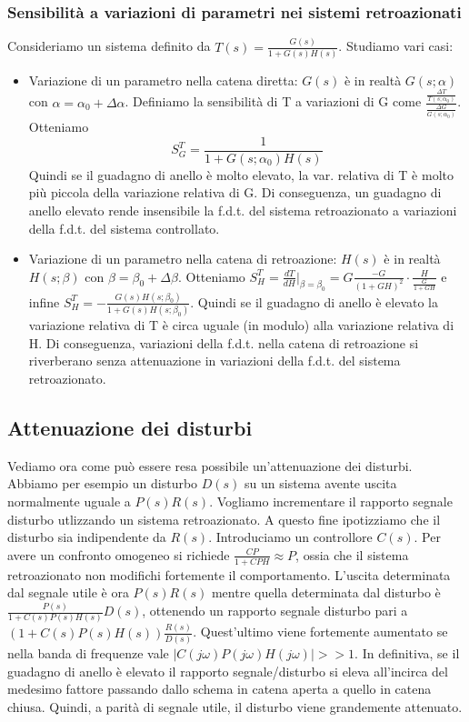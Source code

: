 \documentclass[11pt]{article}
\begin{document}
\subsubsection{Sensibilità a variazioni di parametri nei sistemi retroazionati}
Consideriamo un sistema definito da $T(s)=\frac{G(s)}{1+G(s)H(s)}$. Studiamo vari casi:
\begin{itemize}
    \item Variazione di un parametro nella catena diretta: $G(s)$ è in realtà $G(s;\alpha)$ con $\alpha=\alpha_0+\Delta\alpha$. Definiamo la sensibilità di T a variazioni di G come $\frac{\frac{\Delta T}{T(s;\alpha_0)}}{\frac{\Delta G}{G(s;\alpha_0)}}$. Otteniamo \begin{displaymath}
              S_G^T=\frac{1}{1+G(s;\alpha_0)H(s)}
          \end{displaymath} Quindi se il guadagno di anello è molto elevato, la var. relativa di T è molto più piccola della variazione relativa di G. Di conseguenza, un guadagno di anello elevato rende insensibile la f.d.t. del sistema retroazionato a variazioni della f.d.t. del sistema controllato.
    \item Variazione di un parametro nella catena di retroazione: $H(s)$ è in realtà $H(s;\beta)$ con $\beta = \beta_0+\Delta\beta$. Otteniamo $S_H^T = \frac{dT}{dH}|_{\beta=\beta_0}=G\frac{-G}{(1+GH)^2}\cdot\frac{H}{\frac{G}{1+GH}}$ e infine $S_H^T = -\frac{G(s)H(s;\beta_0)}{1+G(s)H(s;\beta_0)}$. Quindi se il guadagno di anello è elevato la variazione relativa di T è circa uguale (in modulo) alla variazione relativa di H. Di conseguenza, variazioni della f.d.t. nella catena di retroazione si riverberano senza attenuazione in variazioni della f.d.t. del sistema retroazionato.
\end{itemize}
\subsection{Attenuazione dei disturbi}
Vediamo ora come può essere resa possibile un'attenuazione dei disturbi. Abbiamo per esempio un disturbo $D(s)$ su un sistema avente uscita normalmente uguale a $P(s)R(s)$. Vogliamo incrementare il rapporto segnale disturbo utlizzando un sistema retroazionato. A questo fine ipotizziamo che il disturbo sia indipendente da $R(s)$. Introduciamo un controllore $C(s)$. Per avere un confronto omogeneo si richiede $\frac{CP}{1+CPH} \approx P$, ossia che il sistema retroazionato non modifichi fortemente il comportamento. L'uscita determinata dal segnale utile è ora $P(s)R(s)$ mentre quella determinata dal disturbo è $\frac{P(s)}{1+C(s)P(s)H(s)}D(s)$, ottenendo un rapporto segnale disturbo pari a $\left(1+C(s)P(s)H(s)\right)\frac{R(s)}{D(s)}$. Quest'ultimo viene fortemente aumentato se nella banda di frequenze vale $|C(j\omega)P(j\omega)H(j\omega)|>>1$. In definitiva, se il guadagno di anello è elevato il rapporto segnale/disturbo si eleva all'incirca del medesimo fattore passando dallo schema in catena aperta a quello in catena chiusa. Quindi, a parità di segnale utile, il disturbo viene grandemente attenuato.
\end{document}
